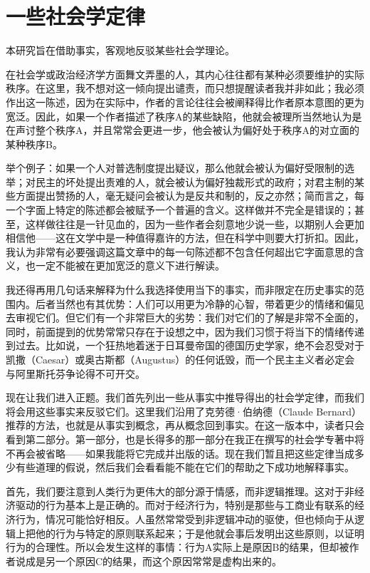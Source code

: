 \chapter{一些社会学定律}

本研究旨在借助事实，客观地反驳某些社会学理论。

在社会学或政治经济学方面舞文弄墨的人，其内心往往都有某种必须要维护的实际秩序。在这里，我不想对这一倾向提出谴责，而只想提醒读者我并非如此；我必须作出这一陈述，因为在实际中，作者的言论往往会被阐释得比作者原本意图的更为宽泛。因此，如果一个作者描述了秩序A的某些缺陷，他就会被理所当然地认为是在声讨整个秩序A，并且常常会更进一步，他会被认为偏好处于秩序A的对立面的某种秩序B。

举个例子：如果一个人对普选制度提出疑议，那么他就会被认为偏好受限制的选举；对民主的坏处提出责难的人，就会被认为偏好独裁形式的政府；对君主制的某些方面提出赞扬的人，毫无疑问会被认为是反共和制的，反之亦然；简而言之，每一个字面上特定的陈述都会被赋予一个普遍的含义。这样做并不完全是错误的；甚至，这样做往往是一针见血的，因为一些作者会刻意地少说一些，以期别人会更加相信他——这在文学中是一种值得嘉许的方法，但在科学中则要大打折扣。因此，我认为非常有必要强调这篇文章中的每一句陈述都不包含任何超出它字面意思的含义，也一定不能被在更加宽泛的意义下进行解读。

我还得再用几句话来解释为什么我选择使用当下的事实，而非限定在历史事实的范围内。后者当然也有其优势：人们可以用更为冷静的心智，带着更少的情绪和偏见去审视它们。但它们有一个非常巨大的劣势：我们对它们的了解是非常不全面的，同时，前面提到的优势常常只存在于设想之中，因为我们习惯于将当下的情绪传递到过去。比如说，一个狂热地着迷于日耳曼帝国的德国历史学家，绝不会忍受对于凯撒（Caesar）或奥古斯都（Augustus）的任何诋毁，而一个民主主义者必定会与阿里斯托芬争论得不可开交。

现在让我们进入正题。我们首先列出一些从事实中推导得出的社会学定律，而我们将会用这些事实来反驳它们。这里我们沿用了克劳德·伯纳德（Claude Bernard）推荐的方法，也就是从事实到概念，再从概念回到事实。在这一版本中，读者只会看到第二部分。第一部分，也是长得多的那一部分在我正在撰写的社会学专著中将不再会被省略——如果我能将它完成并出版的话。现在我们暂且把这些定律当成多少有些道理的假说，然后我们会看看能不能在它们的帮助之下成功地解释事实。

首先，我们要注意到人类行为更伟大的部分源于情感，而非逻辑推理。这对于非经济驱动的行为基本上是正确的。而对于经济行为，特别是那些与工商业有联系的经济行为，情况可能恰好相反。人虽然常常受到非逻辑冲动的驱使，但也倾向于从逻辑上把他的行为与特定的原则联系起来；于是他就会事后发明出这些原则，以证明行为的合理性。所以会发生这样的事情：行为A实际上是原因B的结果，但却被作者说成是另一个原因C的结果，而这个原因常常是虚构出来的。

